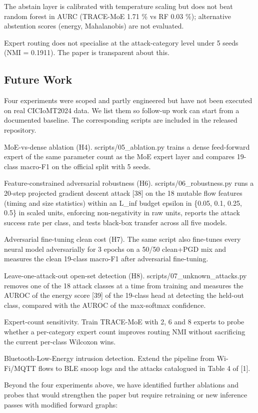\documentclass[11pt]{article}
\begin{document}
The abstain layer is calibrated with temperature scaling but does not beat random forest in AURC (TRACE-MoE 1.71 \% vs RF 0.03 \%); alternative abstention scores (energy, Mahalanobis) are not evaluated.

Expert routing does not specialise at the attack-category level under 5 seeds (NMI = 0.1911). The paper is transparent about this.

\subsection{Future Work}
Four experiments were scoped and partly engineered but have not been executed on real CICIoMT2024 data. We list them so follow-up work can start from a documented baseline. The corresponding scripts are included in the released repository.

MoE-vs-dense ablation (H4). scripts/05\_ablation.py trains a dense feed-forward expert of the same parameter count as the MoE expert layer and compares 19-class macro-F1 on the official split with 5 seeds.

Feature-constrained adversarial robustness (H6). scripts/06\_robustness.py runs a 20-step projected gradient descent attack [38] on the 18 mutable flow features (timing and size statistics) within an L\_inf budget epsilon in \{0.05, 0.1, 0.25, 0.5\} in scaled units, enforcing non-negativity in raw units, reports the attack success rate per class, and tests black-box transfer across all five models.

Adversarial fine-tuning clean cost (H7). The same script also fine-tunes every neural model adversarially for 3 epochs on a 50/50 clean+PGD mix and measures the clean 19-class macro-F1 after adversarial fine-tuning.

Leave-one-attack-out open-set detection (H8). scripts/07\_unknown\_attacks.py removes one of the 18 attack classes at a time from training and measures the AUROC of the energy score [39] of the 19-class head at detecting the held-out class, compared with the AUROC of the max-softmax confidence.

Expert-count sensitivity. Train TRACE-MoE with 2, 6 and 8 experts to probe whether a per-category expert count improves routing NMI without sacrificing the current per-class Wilcoxon wins.

Bluetooth-Low-Energy intrusion detection. Extend the pipeline from Wi-Fi/MQTT flows to BLE snoop logs and the attacks catalogued in Table 4 of [1].

Beyond the four experiments above, we have identified further ablations and probes that would strengthen the paper but require retraining or new inference passes with modified forward graphs:
\end{document}
